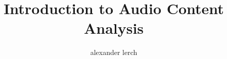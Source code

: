 \title[]{Introduction to \textbf{Audio Content Analysis}}   
\author[alexander lerch]{alexander lerch} 
